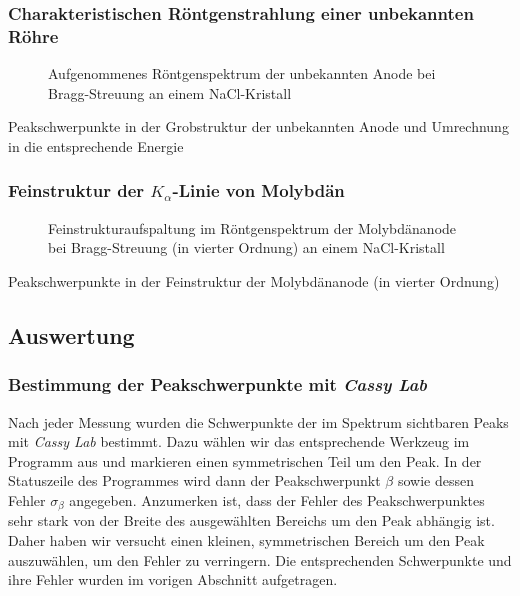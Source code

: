\documentclass[10pt, a4paper]{article}
\begin{document}
\subsubsection{Charakteristischen Röntgenstrahlung einer unbekannten Röhre}


\begin{figure}[!h]
\centering

\caption{Aufgenommenes Röntgenspektrum der unbekannten Anode bei Bragg-Streuung an einem NaCl-Kristall}
\label{fig:anode3}
\end{figure}

\begin{table}[!h]
\centering

\caption{Peakschwerpunkte in der Grobstruktur der unbekannten Anode und Umrechnung in die entsprechende Energie}
\label{fig:peakschwerpunkt_grobstruktur}
\end{table}

\newpage
\subsubsection{Feinstruktur der $K_\alpha$-Linie von Molybdän}

\begin{figure}[!h]
\centering

\caption{Feinstrukturaufspaltung im Röntgenspektrum der Molybdänanode bei Bragg-Streuung (in vierter Ordnung) an einem NaCl-Kristall}
\label{fig:feinstruktur}
\end{figure}

\begin{table}[!h]
\centering

\caption{Peakschwerpunkte in der Feinstruktur der Molybdänanode (in vierter Ordnung)}
\label{fig:peakschwerpunkt_feinstruktur}
\end{table}

\newpage
\subsection{Auswertung}

\subsubsection{Bestimmung der Peakschwerpunkte mit \emph{Cassy Lab}}
Nach jeder Messung wurden die Schwerpunkte der im Spektrum sichtbaren Peaks mit \emph{Cassy Lab} bestimmt.
Dazu wählen wir das entsprechende Werkzeug im Programm aus und markieren einen symmetrischen Teil um den Peak.
In der Statuszeile des Programmes wird dann der Peakschwerpunkt $\beta$ sowie dessen Fehler $\sigma_\beta$ angegeben.
Anzumerken ist, dass der Fehler des Peakschwerpunktes sehr stark von der Breite des ausgewählten Bereichs um den Peak abhängig ist.
Daher haben wir versucht einen kleinen, symmetrischen Bereich um den Peak auszuwählen, um den Fehler zu verringern.
Die entsprechenden Schwerpunkte und ihre Fehler wurden im vorigen Abschnitt aufgetragen.
\end{document}
